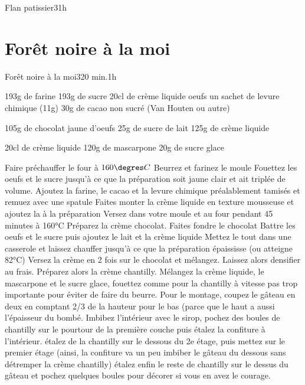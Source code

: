 {\begin{recette}{Flan patissier}{3}{}{1h}
\begin{cuisson}
\end{cuisson}
\end{recette}

\section{Forêt noire à la moi}
\begin{recette}{Forêt noire à la moi}{3}{20 min.}{1h}
\begin{ingredients}
\ingredient 193g de farine
\ingredient 193g de sucre
\ingredient 20cl de crème liquide
 oeufs
\ingredient un sachet de levure chimique (11g)
\ingredient 30g de cacao non sucré (Van Houten ou autre)

\ingredient 105g de chocolat
 jaune d'oeufs
\ingredient 25g de sucre
 de lait
\ingredient 125g de crème liquide

\ingredient 20cl de crème liquide
\ingredient 120g de mascarpone
\ingredient 20g de sucre glace

\end{ingredients}

\begin{preparation}
\etape Faire préchauffer le four à $160\degres C$
\etape Beurrez et farinez le moule
\etape Fouettez les oeufs et le sucre jusqu'à ce que la préparation soit jaune clair et ait triplée de volume.
\etape Ajoutez la farine, le cacao et la levure chimique préalablement tamisés et remuez avec une spatule
\etape Faites monter la crème liquide en texture mousseuse et ajoutez la à la préparation
\etape Versez dans votre moule et au four pendant 45 minutes à 160°C
\etape [facultatif] Préparez la crème chocolat. 
\etape Faites fondre le chocolat
\etape Battre les oeufs et le sucre puis ajoutez le lait et la crème liquide
\etape Mettez le tout dans une casserole et laissez chauffer jusqu'à ce que la préparation épaississe (ou atteigne 82°C)
\etape Versez la crème en 2 fois sur le chocolat et mélangez. Laissez alors densifier au frais.
\etape Préparez alors la crème chantilly. Mélangez la crème liquide, le mascarpone et le sucre glace, fouettez comme pour la chantilly à vitesse pas trop importante pour éviter de faire du beurre.
\etape Pour le montage, coupez le gâteau en deux en comptant 2/3 de la hauteur pour le bas (parce que le haut a aussi l'épaisseur du bombé.
Imbibez l'intérieur avec le sirop, pochez des boules de chantilly sur le pourtour de la première couche puis étalez la confiture à l'intérieur.
\etape étalez de la chantilly sur le dessous du 2e étage, puis mettez sur le premier étage (ainsi, la confiture va un peu imbiber le gâteau du dessous sans détremper la crème chantilly)
\etape étalez enfin le reste de chantilly sur le dessus du gâteau et pochez quelques boules pour décorer si vous en avez le courage.


\end{preparation}
\end{recette}}

